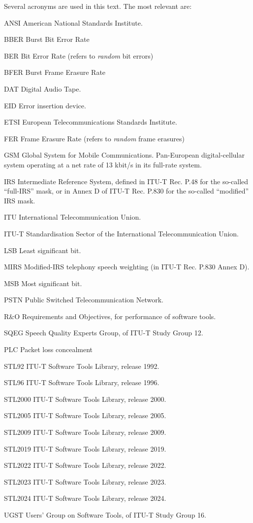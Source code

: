 Several acronyms are used in this text.
The most relevant are:
\begin{Descr}{20mm}
\item[ANSI]  American National Standards Institute.
\item[BBER]  Burst Bit Error Rate
\item[BER]   Bit Error Rate (refers to {\em random} bit errors)
\item[BFER]  Burst Frame Erasure Rate
\item[DAT]   Digital Audio Tape.
\item[EID]   Error insertion device.
\item[ETSI]  European Telecommunications Standards Institute.
\item[FER]   Frame Erasure Rate (refers to {\em random} frame erasures)
\item[GSM]   Global System for Mobile Communications. Pan-European digital-cellular system operating at a net rate of 13 kbit/s in its full-rate system.
\item[IRS]   Intermediate Reference System, defined in ITU-T Rec. P.48 for the so-called ``full-IRS'' mask, or in Annex D of ITU-T Rec. P.830 for the so-called ``modified'' IRS mask.
\item[ITU]   International Telecommunication Union.
\item[ITU-T] Standardisation Sector of the International Telecommunication Union.
\item[LSB]   Least significant bit.
\item[MIRS]  Modified-IRS telephony speech weighting (in ITU-T Rec. P.830 Annex D).
\item[MSB]   Most significant bit.
\item[PSTN]  Public Switched Telecommunication Network.
\item[R\&O]  Requirements and Objectives, for performance of software tools.
\item[SQEG]  Speech Quality Experts Group, of ITU-T Study Group 12.
\item[PLC]   Packet loss concealment
\item[STL92] ITU-T Software Tools Library, release 1992.
\item[STL96] ITU-T Software Tools Library, release 1996.
\item[STL2000] ITU-T Software Tools Library, release 2000.
\item[STL2005] ITU-T Software Tools Library, release 2005.
\item[STL2009] ITU-T Software Tools Library, release 2009.
\item[STL2019] ITU-T Software Tools Library, release 2019.
\item[STL2022] ITU-T Software Tools Library, release 2022.
\item[STL2023] ITU-T Software Tools Library, release 2023.
\item[STL2024] ITU-T Software Tools Library, release 2024.
\item[UGST]  Users' Group on Software Tools, of ITU-T Study Group 16.
\end{Descr}


